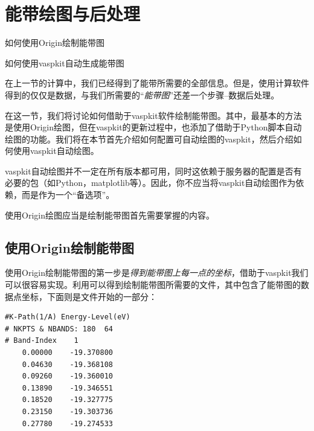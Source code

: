 \section{能带绘图与后处理}\label{sec:能带绘图与后处理}

\begin{Abstract}
    \item 如何使用Origin绘制能带图
    \item 如何使用vaspkit自动生成能带图
\end{Abstract}


在上一节的计算中，我们已经得到了能带所需要的全部信息。但是，使用计算软件得到的仅仅是数据，与我们所需要的“\emph{能带图}”还差一个步骤--数据后处理。

在这一节，我们将讨论如何借助于vaspkit软件绘制能带图。其中，最基本的方法是使用Origin绘图，但在vaspkit的更新过程中，也添加了借助于Python脚本自动绘图的功能。我们将在本节首先介绍如何配置可自动绘图的vaspkit，然后介绍如何使用vaspkit自动绘图。

\begin{attention}
    vaspkit自动绘图并不一定在所有版本都可用，同时这依赖于服务器的配置是否有必要的包（如Python，matplotlib等）。因此，你不应当将vaspkit自动绘图作为依赖，而是作为一个“备选项”。

    使用Origin绘图应当是绘制能带图首先需要掌握的内容。
\end{attention}

\subsection{使用Origin绘制能带图}\label{subsec:能带绘图与后处理-使用Origin绘制能带图}

使用Origin绘制能带图的第一步是\emph{得到能带图上每一点的坐标}，借助于vaspkit我们可以很容易实现。利用可以得到绘制能带图所需要的文件，其中包含了能带图的数据点坐标，下面则是文件开始的一部分：

\begin{lstlisting}[caption=BAND.dat]
#K-Path(1/A) Energy-Level(eV)
# NKPTS & NBANDS: 180  64
# Band-Index    1
    0.00000    -19.370800
    0.04630    -19.368108
    0.09260    -19.360010
    0.13890    -19.346551
    0.18520    -19.327775
    0.23150    -19.303736
    0.27780    -19.274533
\end{lstlisting}

